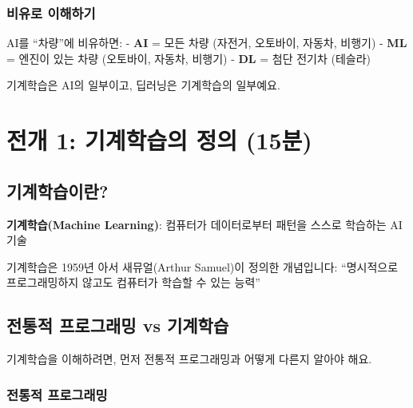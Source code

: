 \documentclass[a4paper, 11pt]{article}
\renewenvironment{quote}
  {\begin{tcolorbox}[colback=lightblue!30, colframe=mainblue!50,
   left=8pt, right=8pt, top=4pt, bottom=4pt, breakable]}
  {\end{tcolorbox}}
\begin{document}
\hypertarget{uxbe44uxc720uxb85c-uxc774uxd574uxd558uxae30}{%
\subsubsection{비유로
이해하기}\label{uxbe44uxc720uxb85c-uxc774uxd574uxd558uxae30}}

AI를 ``차량''에 비유하면: - \textbf{AI} = 모든 차량 (자전거, 오토바이,
자동차, 비행기) - \textbf{ML} = 엔진이 있는 차량 (오토바이, 자동차,
비행기) - \textbf{DL} = 첨단 전기차 (테슬라)

기계학습은 AI의 일부이고, 딥러닝은 기계학습의 일부예요.

\hypertarget{uxc804uxac1c-1-uxae30uxacc4uxd559uxc2b5uxc758-uxc815uxc758-15uxbd84}{%
\section{ 전개 1: 기계학습의 정의
(15분)}\label{uxc804uxac1c-1-uxae30uxacc4uxd559uxc2b5uxc758-uxc815uxc758-15uxbd84}}

\hypertarget{uxae30uxacc4uxd559uxc2b5uxc774uxb780}{%
\subsection{기계학습이란?}\label{uxae30uxacc4uxd559uxc2b5uxc774uxb780}}

\begin{quote}
\textbf{기계학습(Machine Learning)}: 컴퓨터가 데이터로부터 패턴을 스스로
학습하는 AI 기술
\end{quote}

기계학습은 1959년 아서 새뮤얼(Arthur Samuel)이 정의한 개념입니다:
``명시적으로 프로그래밍하지 않고도 컴퓨터가 학습할 수 있는 능력''

\hypertarget{uxc804uxd1b5uxc801-uxd504uxb85cuxadf8uxb798uxbc0d-vs-uxae30uxacc4uxd559uxc2b5}{%
\subsection{전통적 프로그래밍 vs
기계학습}\label{uxc804uxd1b5uxc801-uxd504uxb85cuxadf8uxb798uxbc0d-vs-uxae30uxacc4uxd559uxc2b5}}

기계학습을 이해하려면, 먼저 전통적 프로그래밍과 어떻게 다른지 알아야
해요.

\hypertarget{uxc804uxd1b5uxc801-uxd504uxb85cuxadf8uxb798uxbc0d}{%
\subsubsection{전통적
프로그래밍}\label{uxc804uxd1b5uxc801-uxd504uxb85cuxadf8uxb798uxbc0d}}
\end{document}
